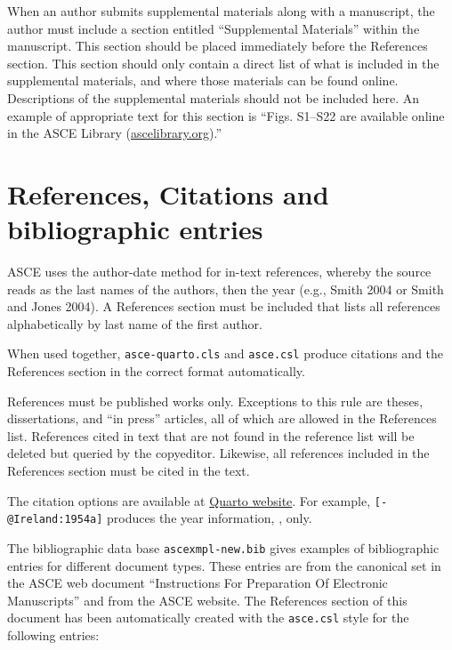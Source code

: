 \documentclass[Journal,LineNumbers]{ascelike-new}
\begin{document}
When an author submits supplemental materials along with a manuscript,
the author must include a section entitled ``Supplemental Materials''
within the manuscript. This section should be placed immediately before
the References section. This section should only contain a direct list
of what is included in the supplemental materials, and where those
materials can be found online. Descriptions of the supplemental
materials should not be included here. An example of appropriate text
for this section is ``Figs. S1--S22 are available online in the ASCE
Library (\href{http://ascelibrary.org/}{ascelibrary.org}).''

\section{References, Citations and bibliographic
entries}\label{references-citations-and-bibliographic-entries}

ASCE uses the author-date method for in-text references, whereby the
source reads as the last names of the authors, then the year (e.g.,
Smith 2004 or Smith and Jones 2004). A References section must be
included that lists all references alphabetically by last name of the
first author.

When used together, \texttt{asce-quarto.cls} and \texttt{asce.csl}
produce citations and the References section in the correct format
automatically.

References must be published works only. Exceptions to this rule are
theses, dissertations, and ``in press'' articles, all of which are
allowed in the References list. References cited in text that are not
found in the reference list will be deleted but queried by the
copyeditor. Likewise, all references included in the References section
must be cited in the text.

The citation options are available at
\href{https://quarto.org/docs/authoring/citations.html}{Quarto website}.
For example, \texttt{{[}-@Ireland:1954a{]}} produces the year
information, \citeyearpar{Ireland:1954a}, only.

The bibliographic data base \texttt{ascexmpl-new.bib} gives examples of
bibliographic entries for different document types. These entries are
from the canonical set in the ASCE web document ``Instructions For
Preparation Of Electronic Manuscripts'' and from the ASCE website. The
References section of this document has been automatically created with
the \texttt{asce.csl} style for the following entries:
\end{document}
